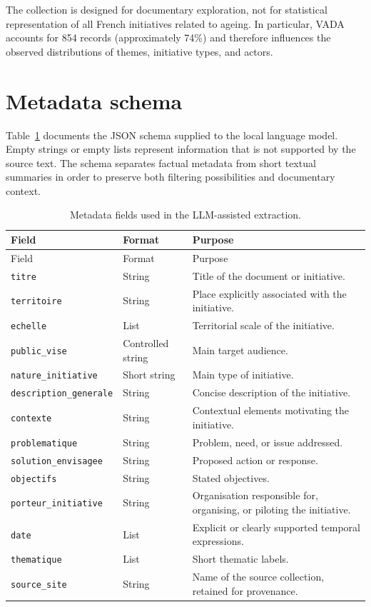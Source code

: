 The collection is designed for documentary exploration, not for statistical
representation of all French initiatives related to ageing. In particular, VADA
accounts for 854 records (approximately 74\%) and therefore influences the
observed distributions of themes, initiative types, and actors.

\section{Metadata schema}

Table~\ref{tab:appendix-schema} documents the JSON schema supplied to the
local language model. Empty strings or empty lists represent information that is
not supported by the source text. The schema separates factual metadata from
short textual summaries in order to preserve both filtering possibilities and
documentary context.

\begin{longtable}{p{3.3cm}p{2.5cm}p{8cm}}
\caption{Metadata fields used in the LLM-assisted extraction.}
\label{tab:appendix-schema}\\
\toprule
Field & Format & Purpose \\
\midrule
\endfirsthead
\toprule
Field & Format & Purpose \\
\midrule
\endhead
\bottomrule
\endfoot
\texttt{titre} & String & Title of the document or initiative. \\
\texttt{territoire} & String & Place explicitly associated with the initiative. \\
\texttt{echelle} & List & Territorial scale of the initiative. \\
\texttt{public\_vise} & Controlled string & Main target audience. \\
\texttt{nature\_initiative} & Short string & Main type of initiative. \\
\texttt{description\_generale} & String & Concise description of the initiative. \\
\texttt{contexte} & String & Contextual elements motivating the initiative. \\
\texttt{problematique} & String & Problem, need, or issue addressed. \\
\texttt{solution\_envisagee} & String & Proposed action or response. \\
\texttt{objectifs} & String & Stated objectives. \\
\texttt{porteur\_initiative} & String & Organisation responsible for, organising, or piloting the initiative. \\
\texttt{date} & List & Explicit or clearly supported temporal expressions. \\
\texttt{thematique} & List & Short thematic labels. \\
\texttt{source\_site} & String & Name of the source collection, retained for provenance. \\
\end{longtable}

